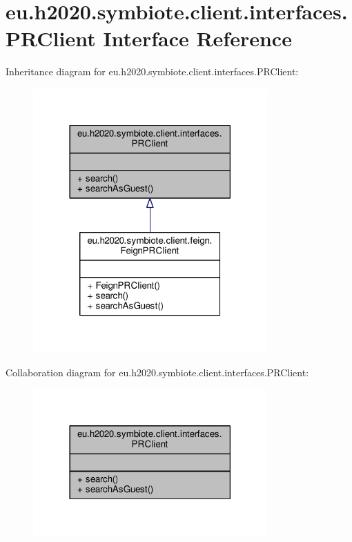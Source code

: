 \hypertarget{interfaceeu_1_1h2020_1_1symbiote_1_1client_1_1interfaces_1_1PRClient}{}\section{eu.\+h2020.\+symbiote.\+client.\+interfaces.\+P\+R\+Client Interface Reference}
\label{interfaceeu_1_1h2020_1_1symbiote_1_1client_1_1interfaces_1_1PRClient}


Inheritance diagram for eu.\+h2020.\+symbiote.\+client.\+interfaces.\+P\+R\+Client\+:
\nopagebreak
\begin{figure}[H]
\begin{center}
\leavevmode
\includegraphics[width=254pt]{interfaceeu_1_1h2020_1_1symbiote_1_1client_1_1interfaces_1_1PRClient__inherit__graph}
\end{center}
\end{figure}


Collaboration diagram for eu.\+h2020.\+symbiote.\+client.\+interfaces.\+P\+R\+Client\+:
\nopagebreak
\begin{figure}[H]
\begin{center}
\leavevmode
\includegraphics[width=254pt]{interfaceeu_1_1h2020_1_1symbiote_1_1client_1_1interfaces_1_1PRClient__coll__graph}
\end{center}
\end{figure}
